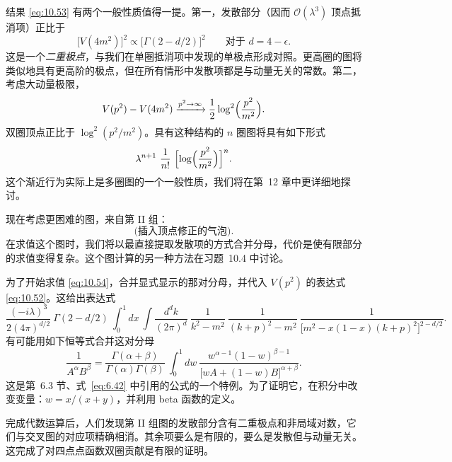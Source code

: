 结果 \eqref{eq:10.53} 有两个一般性质值得一提。第一，发散部分（因而 $\mathcal{O}(\lambda^3)$ 顶点抵消项）正比于
\begin{equation}
  \bigl[ V(4m^2) \bigr]^2 \propto \bigl[ \Gamma(2-d/2) \bigr]^2
  \qquad \text{对于 } d = 4-\epsilon .
\end{equation}
这是一个\emph{二重极点}，与我们在单圈抵消项中发现的单极点形成对照。更高圈的图将类似地具有更高阶的极点，但在所有情形中发散项都是与动量无关的常数。第二，考虑大动量极限，
\begin{equation}
  V(p^2) - V(4m^2) \xrightarrow{p^2\to\infty}
    \frac{1}{2}\log^2\Bigl( \frac{p^2}{m^2} \Bigr) .
\end{equation}
双圈顶点正比于 $\log^2(p^2/m^2)$。具有这种结构的 $n$ 圈图将具有如下形式
\begin{equation}
  \lambda^{n+1}\ \frac{1}{n!}\ \Bigl[ \log\Bigl( \frac{p^2}{m^2} \Bigr)
    \Bigr]^n .
\end{equation}
这个渐近行为实际上是多圈图的一个一般性质，我们将在第~12 章中更详细地探讨。

现在考虑更困难的图，来自第 II 组：
\begin{equation}
  \text{(插入顶点修正的气泡)} .
  \label{eq:10.54}
\end{equation}
在求值这个图时，我们将以最直接提取发散项的方式合并分母，代价是使有限部分的求值变得复杂。这个图计算的另一种方法在习题~10.4 中讨论。

为了开始求值 \eqref{eq:10.54}，合并显式显示的那对分母，并代入 $V(p^2)$ 的表达式 \eqref{eq:10.52}。这给出表达式
\begin{equation}
  \frac{(-i\lambda)^3}{2(4\pi)^{d/2}}\ \Gamma(2-d/2)\ \int_0^1 dx\ \int
    \frac{d^dk}{(2\pi)^d}\ \frac{1}{k^2-m^2}\ \frac{1}{(k+p)^2-m^2}\
    \frac{1}{\bigl[ m^2 - x(1-x)(k+p)^2 \bigr]^{2-d/2}} .
  \label{eq:10.55}
\end{equation}
有可能用如下恒等式合并这对分母
\begin{equation}
  \frac{1}{A^\alpha B^\beta} = \frac{\Gamma(\alpha+\beta)}
    {\Gamma(\alpha)\Gamma(\beta)}\ \int_0^1 dw\ \frac{w^{\alpha-1}(1-w)^{\beta-1}}
      {\bigl[ wA + (1-w)B \bigr]^{\alpha+\beta}} .
  \label{eq:10.56}
\end{equation}
这是第~6.3 节、式~\eqref{eq:6.42} 中引用的公式的一个特例。为了证明它，在积分中改变变量：$w = x/(x+y)$，并利用 beta 函数的定义。

完成代数运算后，人们发现第 II 组图的发散部分含有二重极点和非局域对数，它们与交叉图的对应项精确相消。其余项要么是有限的，要么是发散但与动量无关。这完成了对四点点函数双圈贡献是有限的证明。

